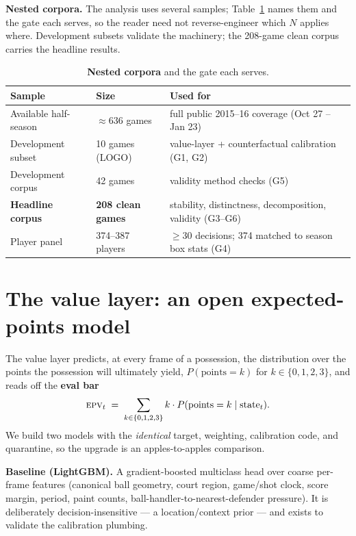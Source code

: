 \documentclass[11pt]{article}
\newcommand{\epv}{\textsc{epv}}
\begin{document}
\textbf{Nested corpora.} The analysis uses several samples; Table~\ref{tab:corpora} names them and the
gate each serves, so the reader need not reverse-engineer which $N$ applies where. Development subsets
validate the machinery; the 208-game clean corpus carries the headline results.

\begin{table}[h]
\centering
\caption{\textbf{Nested corpora} and the gate each serves.}
\label{tab:corpora}
\small
\begin{tabular}{@{}lll@{}}
\toprule
Sample & Size & Used for \\
\midrule
Available half-season & $\approx\!636$ games & full public 2015--16 coverage (Oct 27 -- Jan 23) \\
Development subset     & 10 games (LOGO)      & value-layer + counterfactual calibration (G1, G2) \\
Development corpus     & 42 games             & validity method checks (G5) \\
\textbf{Headline corpus} & \textbf{208 clean games} & stability, distinctness, decomposition, validity (G3--G6) \\
Player panel           & 374--387 players     & $\ge\!30$ decisions; 374 matched to season box stats (G4) \\
\bottomrule
\end{tabular}
\end{table}

\section{The value layer: an open expected-points model}\label{sec:valuelayer}
The value layer predicts, at every frame of a possession, the distribution over the points the
possession will ultimately yield, $P(\text{points}=k)$ for $k\in\{0,1,2,3\}$, and reads off the
\textbf{eval bar}
\begin{equation}
  \epv{}_t \;=\; \sum_{k\in\{0,1,2,3\}} k \cdot P(\text{points}=k \mid \text{state}_t).
\end{equation}
We build two models with the \emph{identical} target, weighting, calibration code, and quarantine, so the
upgrade is an apples-to-apples comparison.

\textbf{Baseline (LightGBM).} A gradient-boosted multiclass head over coarse per-frame features
(canonical ball geometry, court region, game/shot clock, score margin, period, paint counts,
ball-handler-to-nearest-defender pressure). It is deliberately decision-insensitive --- a location/context
prior --- and exists to validate the calibration plumbing.
\end{document}
